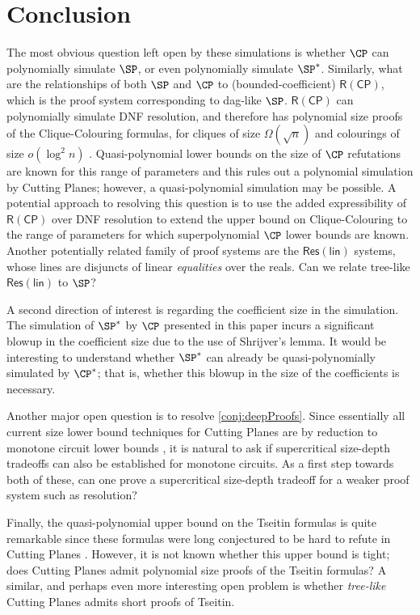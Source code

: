 \documentclass[11pt]{article}
\numberwithin{equation}{section}
\theoremstyle{definition}
\theoremstyle{plain}
\newcounter{cor}\renewcommand{\thecor}{1.1.\arabic{cor}}\newenvironment{cor}{\ifnum\value{cor}=0\refstepcounter{cor}\else\PackageError{toc-native-compat}{Unsupported additional cor envelope}{Only the one exact source-observed cor paragraph is allowed.}\fi}{}\providecommand{\corautorefname}{Theorem}
\newcommand{\RCP}{\ensuremath{\mathsf{R(CP)}}}
\begin{document}
\section{Conclusion}
The most obvious question left open by these simulations is whether $\CP$ can polynomially simulate $\SP$, or even polynomially simulate $\SP^*$. 
Similarly, what are the relationships of both $\SP$ and $\CP$ to (bounded-coefficient) $\RCP$, which is the proof system corresponding to dag-like $\SP$. 
$\RCP$ can polynomially simulate DNF resolution, and therefore has polynomial size proofs of the Clique-Colouring formulas, for cliques of size $\Omega(\sqrt{n})$ and colourings of size $o(\log^2 n)$ \cite{AtseriasBE02}. 
Quasi-polynomial lower bounds on the size of $\CP$ refutations are known for this range of parameters and this rules out a polynomial simulation by Cutting Planes; however, a quasi-polynomial simulation may be possible. A potential approach to resolving this question is to use the added expressibility of $\RCP$ over DNF resolution to extend the upper bound on Clique-Colouring to the range of parameters for which superpolynomial $\CP$ lower bounds are known.
Another potentially related family of proof systems are the $\mathsf{Res(lin)}$ systems, whose lines are disjuncts of linear \emph{equalities} over the reals.
Can we relate tree-like $\mathsf{Res(lin)}$ to $\SP$?

A second direction of interest is regarding the coefficient size in the simulation. The simulation of $\SP^*$ by $\CP$ presented in this paper incurs a significant blowup in the coefficient size due to the use of Shrijver's lemma. It would be interesting to understand whether $\SP^*$ can already be quasi-polynomially simulated by $\CP^*$; that is, whether this blowup in the size of the coefficients is necessary.

Another major open question is to resolve \autoref{conj:deepProofs}. Since essentially all current size lower bound techniques for Cutting Planes are by reduction to monotone circuit lower bounds \cite{Pudlak97, FlemingPPR17,HrubesP17,GargGKS18}, it is natural to ask if supercritical size-depth tradeoffs can also be established for monotone circuits. As a first step towards both of these, can one prove a supercritical size-depth tradeoff for a weaker proof system such as resolution?

Finally, the quasi-polynomial upper bound on the Tseitin formulas \cite{TseitinUpperBound} is quite remarkable since these formulas were long conjectured to be hard to refute in Cutting Planes \cite{CookCT87}. However, it is not known whether this upper bound is tight; does Cutting Planes admit polynomial size proofs of the Tseitin formulas? A similar, and perhaps even more interesting open problem is whether \emph{tree-like} Cutting Planes admits short proofs of Tseitin. 
\end{document}
